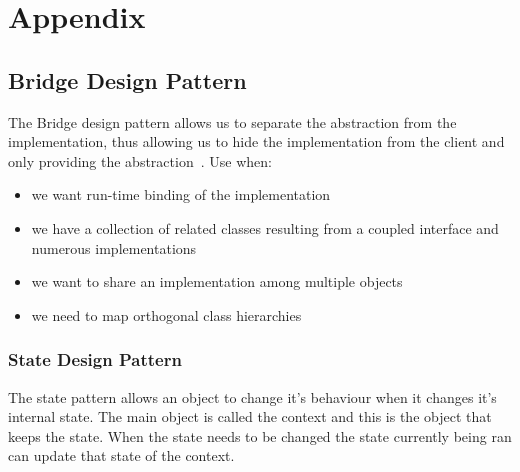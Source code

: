 \chapter{Appendix}

\section{Bridge Design Pattern}
The Bridge design pattern allows us to separate the abstraction from the implementation, thus
allowing us to hide the implementation from the client and only providing the abstraction~\citep{oodesign}.
Use when:
\begin{itemize}
	\item we want run-time binding of the implementation
	\item we have a collection of related classes resulting from a coupled interface and numerous
	implementations
	\item we want to share an implementation among multiple objects
	\item we need to map orthogonal class hierarchies
\end{itemize}

\subsection{State Design Pattern}
The state pattern allows an object to change it's behaviour when it changes it's internal state. The main object is called the context and this is the object that keeps the state. When the state needs to be changed the state currently being ran can update that state of the context.
